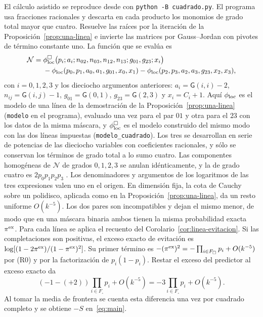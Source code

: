 El cálculo asistido se reproduce desde  con
\texttt{python -B cuadrado.py}. El programa usa fracciones racionales y descarta en cada
producto los monomios de grado total mayor que cuatro. Resuelve las raíces por la iteración
de la Proposición~\ref{prop:una-linea} e invierte las matrices por Gauss--Jordan con pivotes
de término constante uno. La función que se evalúa es
\begin{align}
 \mathcal N={}&\phi_{\mathrm{loc}}^{\square}\bigl(p_i;a_i;n_{02},n_{03},n_{12},n_{13};g_{01},g_{23};x_i\bigr)\notag\\
  &-\phi_{\mathrm{loc}}(p_0,p_1,a_0,a_1,g_{01},x_0,x_1)-\phi_{\mathrm{loc}}(p_2,p_3,a_2,a_3,g_{23},x_2,x_3),
  \label{eq:funcion-cuadrado}
\end{align}
con $i=0,1,2,3$ y los dieciocho argumentos anteriores: $a_i=\mathsf G(i,i)-2$,
$n_{ij}=\mathsf G(i,j)-1$, $g_{01}=\mathsf G(0,1)$, $g_{23}=\mathsf G(2,3)$ y $x_i=C_i+1$. Aquí
$\phi_{\mathrm{loc}}$ es el modelo de una línea de la demostración de la Proposición~\ref{prop:una-linea}
(\texttt{modelo} en el programa), evaluado una vez para el par $01$ y otra para el $23$ con los datos de
la misma máscara, y $\phi_{\mathrm{loc}}^{\square}$ es el modelo construido del mismo modo con las dos líneas
impuestas (\texttt{modelo\_cuadrado}). Los tres se desarrollan en serie de potencias de las dieciocho
variables con coeficientes racionales, y sólo se conservan los términos de grado total a lo sumo
cuatro. Las componentes homogéneas de $\mathcal N$ de grados $0,1,2,3$ se anulan idénticamente, y la de
grado cuatro es $2p_0p_1p_2p_3$ .
Los denominadores y argumentos de los logaritmos de las tres expresiones valen uno
en el origen. En dimensión fija, la cota de Cauchy sobre un polidisco, aplicada como en la
Proposición~\ref{prop:una-linea}, da un resto uniforme $O(k^{-5})$.
Los dos pares son incompatibles y dejan el mismo menor, de modo que en una máscara binaria ambos
tienen la misma probabilidad exacta $\pi^{\rm ex}$. Para cada línea se aplica
el recuento del Corolario~\ref{cor:linea-evitacion}.
Si las completaciones son positivas, el exceso exacto de evitación es
$\log[(1-2\pi^{\rm ex})/(1-\pi^{\rm ex})^2]$.
Su primer término es $-(\pi^{\rm ex})^2=-\prod_{i\in F_\square}p_i+O(k^{-5})$ por (R0)
y por la factorización de $p_i(1-p_i)$. Restar el exceso del predictor al exceso exacto da
\begin{equation}\label{eq:exceso-cuadrado}
 (-1-(+2))\prod_{i\in F_\square}p_i+O(k^{-5})=-3\prod_{i\in F_\square}p_i+O(k^{-5}).
\end{equation}
Al tomar la media de frontera se cuenta
esta diferencia una vez por cuadrado completo y se obtiene $-S$ en~\eqref{eq:main}.
